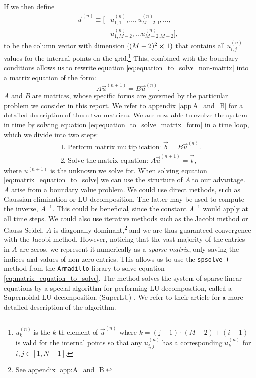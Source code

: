         If we then define 
        \begin{equation}
            \begin{split}
                \vec{u}^{(n)} \equiv [&u_{1,1}^{(n)}, \dots, u_{M-2,1}^{(n)}, \dots, \\ 
                &u_{1,M-2}^{(n)}, \dots u_{M-2, M-2}^{(n)}],
            \end{split}
        \end{equation}
        to be the column vector with dimension $((M-2)^2 \cross 1)$ that contains all $u_{i,j}^{(n)}$ values for the internal points on the grid.\footnote{$u_k^{(n)}$ is the $k$-th element of $\vec{u}^{(n)}$ where $k=(j-1)\cdot(M-2) + (i-1)$ is valid for the internal points so that any $u_{i,j}^{(n)}$ has a corresponding $u_k^{(n)}$ for $i,j\in[1,N-1]$.} This, combined with the boundary conditions allows us to rewrite equation \eqref{eq:equation_to_solve_non-matrix} into a matrix equation of the form:
        \begin{equation}\label{eq:equation_to_solve_matrix_form}
            A\vec{u}^{(n+1)} = B\vec{u}^{(n)}.
        \end{equation}
        $A$ and $B$ are matrices, whose specific forms are governed by the particular problem we consider in this report. We refer to appendix \ref{app:A_and_B} for a detailed description of these two matrices.
        We are now able to evolve the system in time by solving equation \eqref{eq:equation_to_solve_matrix_form} in a time loop, which we divide into two steps:
        \begin{equation}\label{eq:matrix_equation_to_solve}
            \begin{split}
                &\text{1. Perform matrix multiplication: } \vec{b} = B\vec{u}^{(n)}. \\
                &\text{2. Solve the matrix equation: } A\vec{u}^{(n+1)} = \vec{b},
            \end{split}
        \end{equation}
        where $u^{(n+1)}$ is the unknown we solve for. When solving equation \eqref{eq:matrix_equation_to_solve} we can use the structure of $A$ to our advantage. $A$ arise from a boundary value problem. We could use direct methods, such as Gaussian elimination or LU-decomposition. The latter may be used to compute the inverse, $A^{-1}$. This could be beneficial, since the constant $A^{-1}$ would apply at all time steps. We could also use iterative methods such as the Jacobi method or Gauss-Seidel. $A$ is diagonally dominant,\footnote{See appendix \ref{app:A_and_B}} and we are thus guaranteed convergence with the Jacobi method\citep{lecture_notes}. However, noticing that the vast majority of the entries in $A$ are zeros, we represent it numerically as a \textit{sparse matrix}, only saving the indices and values of non-zero entries. This allows us to use the \texttt{spsolve()} method from the \texttt{Armadillo} library to solve equation \eqref{eq:matrix_equation_to_solve}. The method solves the system of sparse linear equations by a special algorithm for performing LU decomposition, called a Supernoidal LU decomposition (SuperLU) \cite{SuperLU}. We refer to their article for a more detailed description of the algorithm.
        
